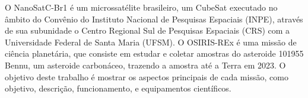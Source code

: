 \begin{resumo}
\hypertarget{estilo:resumo}{} %


O NanoSatC-Br1 é um microssatélite brasileiro, um CubeSat executado no âmbito do Convênio do Instituto Nacional de Pesquisas Espaciais (INPE), através de sua subunidade o Centro Regional Sul de Pesquisas Espaciais (CRS) com a Universidade Federal de Santa Maria (UFSM). O OSIRIS-REx é uma missão de ciência planetária, que consiste em estudar e coletar amostras do asteroide 101955 Bennu, um asteroide carbonáceo, trazendo a amostra até a Terra em 2023. O objetivo deste trabalho é mostrar os aspectos principais de cada missão, como objetivo, descrição, funcionamento, e equipamentos científicos.






\end{resumo}